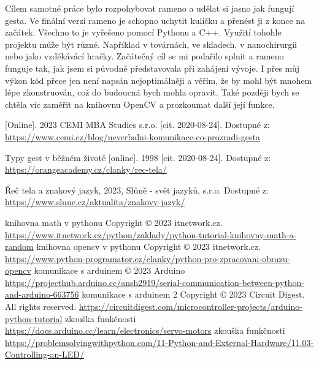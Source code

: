 \documentclass[12pt, a4paper,
twoside,        %
openright
]{report}
\begin{document}
{	Cílem samotné práce bylo rozpohybovat rameno a udělat si jasno jak fungují gesta. Ve finální verzi rameno je schopno uchytit kuličku a přenést ji z konce na začátek. Všechno to je vyřešeno pomocí Pythonu a C++. Využití tohohle projektu může být různé. Například v továrnách, ve skladech, v nanochirurgii nebo jako vzděkávácí hračky. Začátečný cíl se mi podařilo splnit a rameno funguje tak, jak jsem si původně představovala při 
	zahájení vývoje. I přes můj výkon kód přece jen není napsán nejoptimálněji a věřím, že by mohl 
	být mnohem lépe zkonstruován, což do budoucná bych mohla opravit. Také později bych se chtěla víc zaměřit na knihovnu OpenCV a prozkoumat další její funkce. 

	
	\renewcommand\bibname{Literatura}
	\begin{thebibliography}{99}
		 [Online].  2023 CEMI MBA Studies s.r.o. [cit. 2020-08-24]. Dostupné z: \url{https://www.cemi.cz/blog/neverbalni-komunikace-co-prozradi-gesta}
		
		 {Typy gest v běžném životě} [online]. 1998 [cit. 2020-08-24]. Dostupné z: \url{https://orangeacademy.cz/clanky/rec-tela/}
		
		 Řeč tela a znakový jazyk, 2023, Slůně - svět jazyků, s.r.o. Dostupné z: \url{https://www.slune.cz/aktualita/znakovy-jazyk/}
		
		 knihovna math v pythonu Copyright © 2023 itnetwork.cz.
	 \url{https://www.itnetwork.cz/python/zaklady/python-tutorial-knihovny-math-a-random}
	 	 knihovna opencv v pythonu Copyright © 2023 itnetwork.cz.
	 \url{https://www.python-programator.cz/clanky/python-pro-zpracovani-obrazu-opencv}
	  komunikace s arduinem  © 2023 Arduino
	 \url{https://projecthub.arduino.cc/ansh2919/serial-communication-between-python-and-arduino-663756}
	 komunikace s arduinem 2 Copyright © 2023 Circuit Digest. All rights reserved.
	 \url{https://circuitdigest.com/microcontroller-projects/arduino-python-tutorial}
	  zkouška funkčnosti 
	 \url{https://docs.arduino.cc/learn/electronics/servo-motors}
	  zkouška funkčnosti 
	 \url{https://problemsolvingwithpython.com/11-Python-and-External-Hardware/11.03-Controlling-an-LED/}
	 
	 
	 
		
		

\end{thebibliography}}
\end{document}
